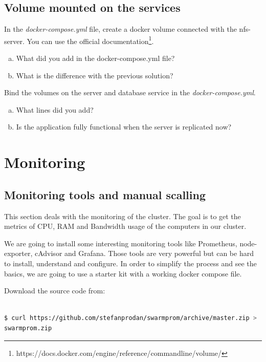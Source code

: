 \documentclass[a4paper,11pt]{exam}
\begin{document}
\subsection{Volume mounted on the services}

\begin{questions}
	\question In the \textit{docker-compose.yml} file, create a docker volume connected with the nfs-server. 
You can use the official documentation\footnote{https://docs.docker.com/engine/reference/commandline/volume/}.
	\begin{enumerate}[(a)]
		\item What did you add in the docker-compose.yml file?
		\item What is the difference with the previous solution?
	\end{enumerate}
	\question Bind the volumes on the server and database service in the \textit{docker-compose.yml}.
	\begin{enumerate}[(a)]
		\item What lines did you add?
		\item Is the application fully functional when the server is replicated now?
	\end{enumerate}
\end{questions}

\clearpage

\section{Monitoring}
\subsection{Monitoring tools and manual scalling}
This section deals with the monitoring of the cluster. The goal is to get the metrics of CPU, RAM and Bandwidth usage of the computers in our cluster.

We are going to install some interesting monitoring tools like Prometheus, node-exporter, cAdvisor and Grafana. 
Those tools are very powerful but can be hard to install, understand and configure.
In order to simplify the process and see the basics, we are going to use a starter kit with a working docker compose file.

Download the source code from:
\begin{lstlisting}[frame=single,language={sh}]  % Start your code-block

$ curl https://github.com/stefanprodan/swarmprom/archive/master.zip >  \
swarmprom.zip
\end{lstlisting}
\end{document}
